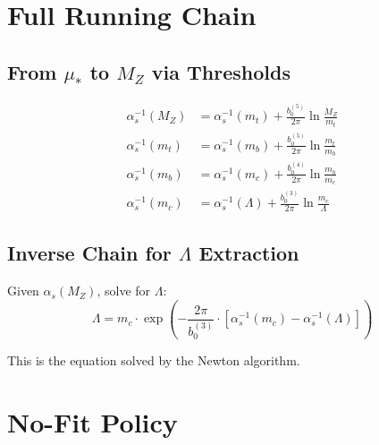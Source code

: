\documentclass[11pt,a4paper]{article}
\theoremstyle{definition}
\begin{document}
\section{Full Running Chain}
\label{sec:full-running}

\subsection{From $\mu_*$ to $M_Z$ via Thresholds}
\label{subsec:full-chain}

\begin{align}
\label{eq:full-run-chain}
\alpha_s^{-1}(M_Z) &= \alpha_s^{-1}(m_t) + \frac{b_0^{(5)}}{2\pi}\ln\frac{M_Z}{m_t} \\
\label{eq:full-run-chain-2}
\alpha_s^{-1}(m_t) &= \alpha_s^{-1}(m_b) + \frac{b_0^{(5)}}{2\pi}\ln\frac{m_t}{m_b} \\
\label{eq:full-run-chain-3}
\alpha_s^{-1}(m_b) &= \alpha_s^{-1}(m_c) + \frac{b_0^{(4)}}{2\pi}\ln\frac{m_b}{m_c} \\
\label{eq:full-run-chain-4}
\alpha_s^{-1}(m_c) &= \alpha_s^{-1}(\Lambda) + \frac{b_0^{(3)}}{2\pi}\ln\frac{m_c}{\Lambda}
\end{align}

\subsection{Inverse Chain for $\Lambda$ Extraction}
\label{subsec:inverse-chain}

Given $\alpha_s(M_Z)$, solve for $\Lambda$:
\begin{equation}
\label{eq:inverse-chain}
\Lambda = m_c \cdot \exp\left(-\frac{2\pi}{b_0^{(3)}} \cdot
  \left[\alpha_s^{-1}(m_c) - \alpha_s^{-1}(\Lambda)\right]\right)
\end{equation}

This is the equation solved by the Newton algorithm.

\section{No-Fit Policy}
\label{sec:no-fit}
\end{document}
